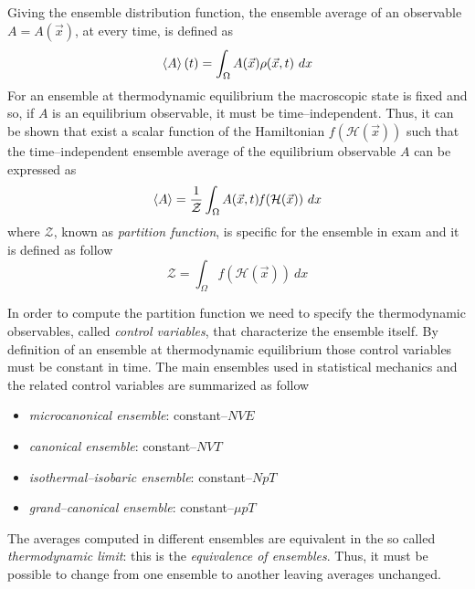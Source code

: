 Giving the ensemble distribution function, the ensemble average of an observable $A=A(\vec x)$, at every time, is
defined as
\begin{equation*}
	\left \langle A \right \rangle(t) = \int_\Omega A(\vec x)\rho(\vec x, t)\ dx
\end{equation*}
For an ensemble at thermodynamic equilibrium the macroscopic state is fixed and so, if $A$ is an equilibrium
observable, it must be time--independent. Thus, it can be shown \cite{Tuckerman} that exist a scalar function of
the Hamiltonian $\mathit{f}(\mathcal{H}(\vec x))$ such that the time--independent ensemble average of the
equilibrium observable $A$ can be expressed as
\begin{equation*}
	\left \langle A \right \rangle = \frac{1}{\mathcal{Z}} \int_\Omega A(\vec x, t) \mathit{f}(\mathcal{H}(\vec x))\ dx
\end{equation*}
where $\mathcal{Z}$, known as \textit{partition function}, is specific for the ensemble in exam and it is defined
as follow
\begin{equation*}
	\mathcal{Z} = \int_\Omega \mathit{f}(\mathcal{H}(\vec x))\ dx
\end{equation*}

In order to compute the partition function we need to specify the thermodynamic observables, called
\textit{control variables}, that characterize the ensemble itself. By definition of an ensemble at thermodynamic
equilibrium those control variables must be constant in time. The main ensembles used in statistical mechanics
and the related control variables are summarized as follow
\begin{itemize}
	\item \textit{microcanonical ensemble}: constant--$NVE$
	\item \textit{canonical ensemble}: constant--$NVT$
	\item \textit{isothermal--isobaric ensemble}: constant--$NpT$
	\item \textit{grand--canonical ensemble}: constant--$\mu pT$
\end{itemize}
The averages computed in different ensembles are equivalent in the so called \textit{thermodynamic limit}: this
is the \textit{equivalence of ensembles}. Thus, it must be possible to change from one ensemble to another
leaving averages unchanged.

